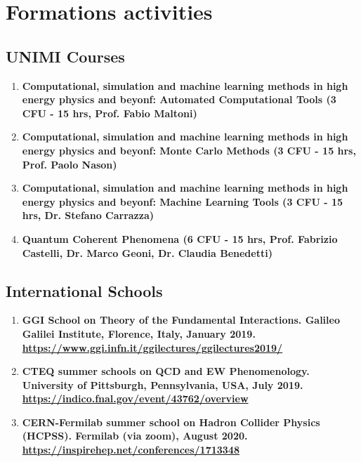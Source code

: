 \documentclass[12pt]{article}
\begin{document}
\newpage

\section{Formations activities}

\subsection{UNIMI Courses}

\begin{enumerate}{\leftmargin 15pt \itemsep 0pt \topsep 3pt}
	\item{\bf Computational, simulation and machine learning methods in high energy physics and beyonf: Automated Computational Tools (3 CFU - 15 hrs, Prof. Fabio Maltoni)}
	\item{\bf Computational, simulation and machine learning methods in high energy physics and beyonf: Monte Carlo Methods (3 CFU - 15 hrs, Prof. Paolo Nason)}
	\item{\bf Computational, simulation and machine learning methods in high energy physics and beyonf: Machine Learning Tools (3 CFU - 15 hrs, Dr. Stefano Carrazza)}
	\item{\bf Quantum Coherent Phenomena (6 CFU - 15 hrs, Prof. Fabrizio Castelli, Dr. Marco Geoni, Dr. Claudia Benedetti)}
\end{enumerate}

\subsection{International Schools}

\begin{enumerate}{\leftmargin 15pt \itemsep 0pt \topsep 3pt}
	\item{\bf GGI School on Theory of the Fundamental Interactions. Galileo Galilei Institute, Florence, Italy, January 2019. \\ \href{https://www.ggi.infn.it/ggilectures/ggilectures2019/}{https://www.ggi.infn.it/ggilectures/ggilectures2019/}}
	\item{\bf CTEQ summer schools on QCD and EW Phenomenology. University of Pittsburgh, Pennsylvania, USA, July 2019. \\ \href{https://indico.fnal.gov/event/43762/overview}{https://indico.fnal.gov/event/43762/overview}}
	\item{\bf CERN-Fermilab summer school on Hadron Collider Physics (HCPSS). Fermilab (via zoom), August 2020. \\ \href{https://inspirehep.net/conferences/1713348}{https://inspirehep.net/conferences/1713348}}
\end{enumerate}
\end{document}
